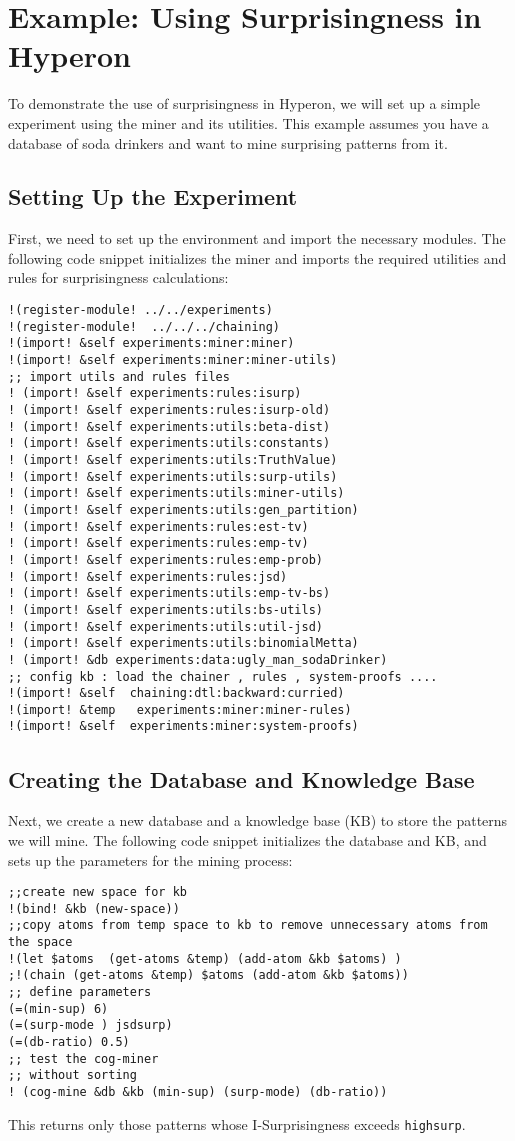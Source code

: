\documentclass{article}
\begin{document}
\section{Example: Using Surprisingness in Hyperon} 
To demonstrate the use of surprisingness in Hyperon, we will set up a simple experiment using the miner and its utilities. This example assumes you have a database of soda drinkers
and want to mine surprising patterns from it.
\subsection{Setting Up the Experiment}
First, we need to set up the environment and import the necessary modules. The following code snippet initializes the miner and imports the required utilities and rules for surprisingness calculations:
\begin{verbatim}
!(register-module! ../../experiments)
!(register-module!  ../../../chaining)
!(import! &self experiments:miner:miner)
!(import! &self experiments:miner:miner-utils)
;; import utils and rules files 
! (import! &self experiments:rules:isurp)
! (import! &self experiments:rules:isurp-old)
! (import! &self experiments:utils:beta-dist)
! (import! &self experiments:utils:constants)
! (import! &self experiments:utils:TruthValue)
! (import! &self experiments:utils:surp-utils)
! (import! &self experiments:utils:miner-utils)
! (import! &self experiments:utils:gen_partition)
! (import! &self experiments:rules:est-tv)
! (import! &self experiments:rules:emp-tv)
! (import! &self experiments:rules:emp-prob)
! (import! &self experiments:rules:jsd)
! (import! &self experiments:utils:emp-tv-bs)
! (import! &self experiments:utils:bs-utils)
! (import! &self experiments:utils:util-jsd)
! (import! &self experiments:utils:binomialMetta)
! (import! &db experiments:data:ugly_man_sodaDrinker)
;; config kb : load the chainer , rules , system-proofs ....
!(import! &self  chaining:dtl:backward:curried)
!(import! &temp   experiments:miner:miner-rules)
!(import! &self  experiments:miner:system-proofs)
\end{verbatim}


\subsection{Creating the Database and Knowledge Base}
Next, we create a new database and a knowledge base (KB) to store the patterns we will mine. The following code snippet initializes the database and KB, and sets up the parameters for the mining process:
\begin{verbatim}
;;create new space for kb
!(bind! &kb (new-space))
;;copy atoms from temp space to kb to remove unnecessary atoms from the space
!(let $atoms  (get-atoms &temp) (add-atom &kb $atoms) )
;!(chain (get-atoms &temp) $atoms (add-atom &kb $atoms))
;; define parameters 
(=(min-sup) 6)
(=(surp-mode ) jsdsurp)
(=(db-ratio) 0.5)
;; test the cog-miner
;; without sorting 
! (cog-mine &db &kb (min-sup) (surp-mode) (db-ratio))
\end{verbatim}










This returns only those patterns whose I-Surprisingness exceeds \texttt{highsurp}.
\end{document}

